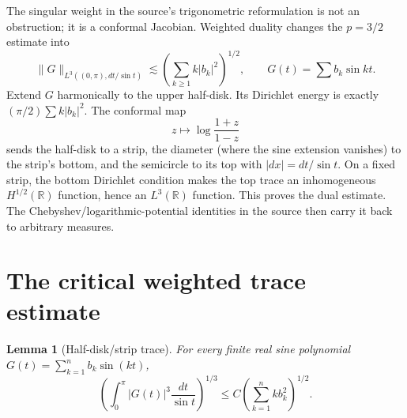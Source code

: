 \documentclass[11pt]{article}
\newtheorem{lemma}{Lemma}
\newcommand{\R}{\mathbb R}
\begin{document}
The singular weight in the source's trigonometric reformulation is not an
obstruction; it is a conformal Jacobian.  Weighted duality changes the
$p=3/2$ estimate into
\[
 \|G\|_{L^3((0,\pi),dt/\sin t)}
 \lesssim \left(\sum_{k\geq1}k|b_k|^2\right)^{1/2},
 \qquad G(t)=\sum b_k\sin kt.
\]
Extend $G$ harmonically to the upper half-disk.  Its Dirichlet energy is
exactly $(\pi/2)\sum k|b_k|^2$.  The conformal map
\[
 z\longmapsto\log\frac{1+z}{1-z}
\]
sends the half-disk to a strip, the diameter (where the sine extension
vanishes) to the strip's bottom, and the semicircle to its top with
$|dx|=dt/\sin t$.  On a fixed strip, the bottom Dirichlet condition makes the
top trace an inhomogeneous $H^{1/2}(\R)$ function, hence an $L^3(\R)$
function.  This proves the dual estimate.  The Chebyshev/logarithmic-potential
identities in the source then carry it back to arbitrary measures.

\section{The critical weighted trace estimate}

\begin{lemma}[Half-disk/strip trace]\label{lem:trace}
For every finite real sine polynomial $G(t)=\sum_{k=1}^n b_k\sin(kt)$,
\begin{equation}\label{eq:trace}
 \left(\int_0^\pi |G(t)|^3\frac{dt}{\sin t}\right)^{1/3}
 \leq C\left(\sum_{k=1}^n k b_k^2\right)^{1/2}.
\end{equation}
\end{lemma}
\end{document}
